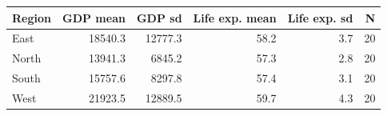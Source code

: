 \begin{tabular}{lrrrrr}
\toprule
Region & GDP mean & GDP sd & Life exp. mean & Life exp. sd & N \\
\midrule
East & 18540.3 & 12777.3 & 58.2 & 3.7 & 20 \\
North & 13941.3 & 6845.2 & 57.3 & 2.8 & 20 \\
South & 15757.6 & 8297.8 & 57.4 & 3.1 & 20 \\
West & 21923.5 & 12889.5 & 59.7 & 4.3 & 20 \\
\bottomrule
\end{tabular}

